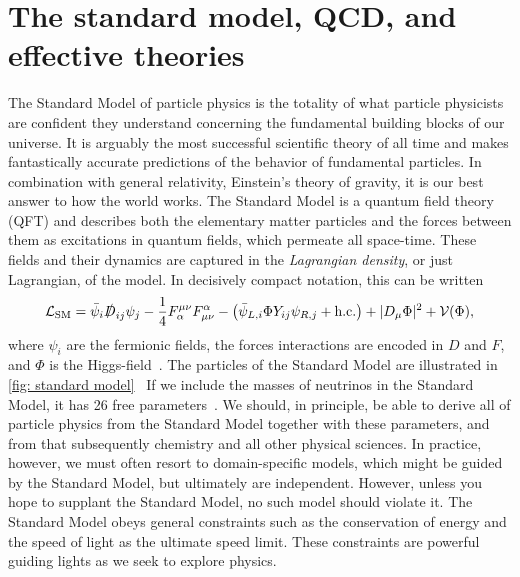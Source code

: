 \section{The standard model, QCD, and effective theories}


The Standard Model of particle physics is the totality of what particle physicists are confident they understand concerning the fundamental building blocks of our universe.
It is arguably the most successful scientific theory of all time and makes fantastically accurate predictions of the behavior of fundamental particles.
In combination with general relativity, Einstein's theory of gravity, it is our best answer to how the world works.
The Standard Model is a quantum field theory (QFT) and describes both the elementary matter particles and the forces between them as excitations in quantum fields, which permeate all space-time.
These fields and their dynamics are captured in the \emph{Lagrangian density}, or just Lagrangian, of the model.
In decisively compact notation, this can be written
%
\begin{equation}
    \mathcal{L}_\text{SM}
    =
    \bar \psi_i \slashed{ D }_{ij}  \psi_j
    - \frac{1}{4} F_\alpha^{\mu\nu} F^\alpha_{\mu \nu}
    - \left( 
        \bar \psi_{L, i} \Phi Y_{ij} \psi_{R, j}
        + \text{h.c.}
    \right)
    + |D_{\mu} \Phi |^2 + \mathcal{V}(\Phi),
\end{equation}
%
where $\psi_i$ are the fermionic fields, the forces interactions are encoded in $D$ and $F$, and $\Phi$ is the Higgs-field~\autocite{carrollWorldEverydayExperience2013,schwartzQuantumFieldTheory2013}.
The particles of the Standard Model are illustrated in \autoref{fig: standard model}~\autocite{griffithsIntroductionElementaryParticles2008,schwartzQuantumFieldTheory2013}
If we include the masses of neutrinos in the Standard Model, it has 26 free parameters~\autocite{kramerStandardModelParticle2017}.
We should, in principle, be able to derive all of particle physics from the Standard Model together with these parameters, and from that subsequently chemistry and all other physical sciences.
In practice, however, we must often resort to domain-specific models, which might be guided by the Standard Model, but ultimately are independent.
However, unless you hope to supplant the Standard Model, no such model should violate it.
The Standard Model obeys general constraints such as the conservation of energy and the speed of light as the ultimate speed limit.
These constraints are powerful guiding lights as we seek to explore physics.



